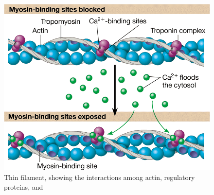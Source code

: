 \documentclass{article}
\begin{document}
\begin{figure}[h]
    \centering
    \includegraphics[width=0.6\linewidth]{binding_unbinding_ca2+.png}
    \caption{Thin filament, showing the interactions among actin, regulatory
    proteins, and }
\end{figure}
\end{document}
